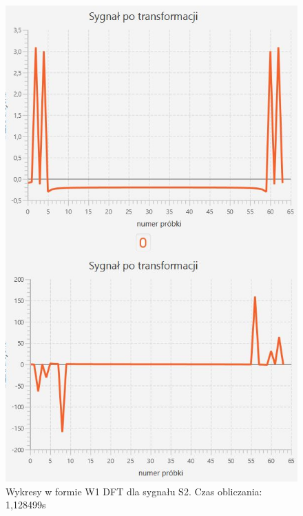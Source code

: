 \documentclass[12pt]{article}
\begin{document}
\begin{figure}[H]
	\centering
	\includegraphics[width=.8\linewidth]{DFT-S2-W1}
	\caption{Wykresy w formie W1 DFT dla sygnału S2. Czas obliczania: 1,128499s}
	\label{S3_sygnal}
\end{figure}
\end{document}
